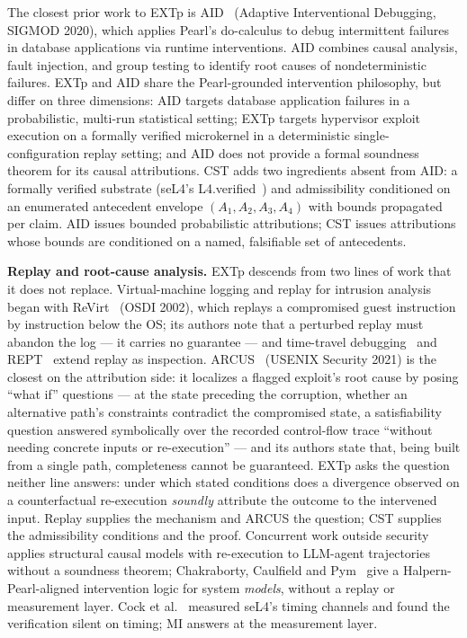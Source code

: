 \documentclass[conference]{IEEEtran}
\begin{document}
The closest prior work to EXTp is AID~\cite{fariha2020aid} (Adaptive
Interventional Debugging, SIGMOD 2020), which applies Pearl's
do-calculus to debug intermittent failures in database applications
via runtime interventions. AID combines causal analysis, fault
injection, and group testing to identify root causes of
nondeterministic failures. EXTp and AID share the Pearl-grounded
intervention philosophy, but differ on three dimensions: AID targets
database application failures in a probabilistic, multi-run
statistical setting; EXTp targets hypervisor exploit execution on a
formally verified microkernel in a deterministic single-configuration
replay setting; and AID does not provide a formal soundness theorem
for its causal attributions. CST adds two ingredients absent from
AID: a formally verified substrate (seL4's
L4.verified~\cite{klein2014sel4}) and admissibility conditioned on
an enumerated antecedent envelope $(A_1, A_2, A_3, A_4)$ with bounds
propagated per claim. AID issues bounded probabilistic
attributions; CST issues attributions whose bounds are conditioned
on a named, falsifiable set of antecedents.

\textbf{Replay and root-cause analysis.} EXTp descends from two
lines of work that it does not replace. Virtual-machine logging
and replay for intrusion analysis began with
ReVirt~\cite{dunlap2002revirt} (OSDI 2002), which replays a
compromised guest instruction by instruction below the OS; its
authors note that a perturbed replay must abandon the log --- it
carries no guarantee --- and time-travel debugging~\cite{king2005ttvm}
and REPT~\cite{cui2018rept} extend replay as inspection. ARCUS~\cite{yagemann2021arcus} (USENIX Security 2021)
is the closest on the attribution side: it localizes a flagged
exploit's root cause by posing ``what if'' questions --- at the
state preceding the corruption, whether an alternative path's
constraints contradict the compromised state, a satisfiability
question answered symbolically over the recorded control-flow
trace ``without needing concrete inputs or re-execution'' --- and
its authors state that, being built from a single path,
completeness cannot be guaranteed. EXTp asks
the question neither line answers: under which stated conditions
does a divergence observed on a counterfactual re-execution
\emph{soundly} attribute the outcome to the intervened input.
Replay supplies the mechanism and ARCUS the question; CST supplies
the admissibility conditions and the proof. Concurrent work outside
security applies structural causal models with re-execution to
LLM-agent trajectories~\cite{shah2026car} without a soundness
theorem; Chakraborty, Caulfield and
Pym~\cite{chakraborty2025causality} give a Halpern-Pearl-aligned
intervention logic for system \emph{models}, without a replay or
measurement layer. Cock et al.~\cite{cock2014lastmile} measured
seL4's timing channels and found the verification silent on
timing; MI answers at the measurement layer.
\end{document}
